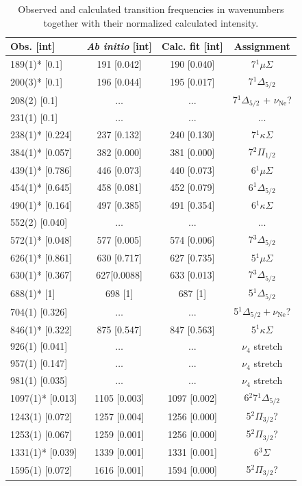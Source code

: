 \begin{table}
\caption{\label{tab:bend-freqs} Observed and calculated transition frequencies in wavenumbers together with their normalized calculated intensity.}
\centering
\begin{threeparttable}

    \begin{tabular}{l c c c}
    \hline

     Obs. [int] & {\em Ab initio} [int] & Calc. fit [int]  & Assignment   \\
     \hline
     189(1)* [0.1] & 191 [0.042] & 190 [0.040] & 7$^1\mu\Sigma$\\
     200(3)* [0.1] & 196 [0.044] & 195 [0.017] & 7$^1\Delta_{5/2}$ \\
     208(2) [0.1] & $\ldots$ & $\ldots$&  7$^1\Delta_{5/2}$ + $\nu_\mathrm{Ne}$?\\
     231(1) [0.1] & $\ldots$ & $\ldots$ & $\ldots$\\
     238(1)* [0.224] &	237 [0.132] & 240 [0.130] & 7$^1\kappa\Sigma$ \\
     384(1)* [0.057] &	382 [0.000] & 381 [0.000] & 7$^2\Pi_{1/2}$ \\
     439(1)* [0.786] &	446 [0.073] & 440 [0.073] & 6$^1\mu\Sigma$ \\
     454(1)* [0.645] &	458 [0.081] & 452 [0.079] & 6$^1\Delta_{5/2}$ \\
     490(1)* [0.164]&	497 [0.385] & 491 [0.354] & 6$^1\kappa\Sigma$ \\
     552(2) [0.040]& $\ldots$ & $\ldots$& $\ldots$\\
     572(1)* [0.048] & 577 [0.005] & 574 [0.006] & 7$^3\Delta_{5/2}$ \\
     626(1)* [0.861] &	630 [0.717] & 627 [0.735] & 5$^1\mu\Sigma$ \\
     630(1)* [0.367] &  627[0.0088] & 633 [0.013] & 7$^3\Delta_{5/2}$\\
     688(1)* [1] &	698 [1] & 687 [1] & 5$^1\Delta_{5/2}$  \\
     704(1) [0.326]  &	$\ldots$ & $\ldots$ & 5$^1\Delta_{5/2}+ \nu_\mathrm{Ne}$? \\
     846(1)* [0.322] &	875 [0.547] & 847 [0.563] & 5$^1\kappa\Sigma$\\
     926(1) [0.041]& $\ldots$ & $\ldots$ & $\nu_4$ stretch\\
     957(1) [0.147]& $\ldots$ & $\ldots$ & $\nu_4$ stretch\\
     981(1) [0.035]& $\ldots$ & $\ldots$ & $\nu_4$ stretch\\
     1097(1)* [0.013] & 1105 [0.003] & 1097 [0.002] & 6$^2$7$^1\Delta_{5/2}$ \\
     1243(1) [0.072] & 1257 [0.004] & 1256 [0.000] & 5$^2\Pi_{3/2}$? \\
     1253(1) [0.067] & 1259 [0.001] & 1256 [0.000] & 5$^2\Pi_{3/2}$?      \\
     1331(1)* [0.039] & 1339 [0.001] & 1331 [0.001] & 6$^3\Sigma$\\
     1595(1) [0.072] & 1616 [0.001] & 1594 [0.000] & 5$^2\Pi_{3/2}$?\\
 

\end{tabular}
\end{threeparttable}
\end{table}
